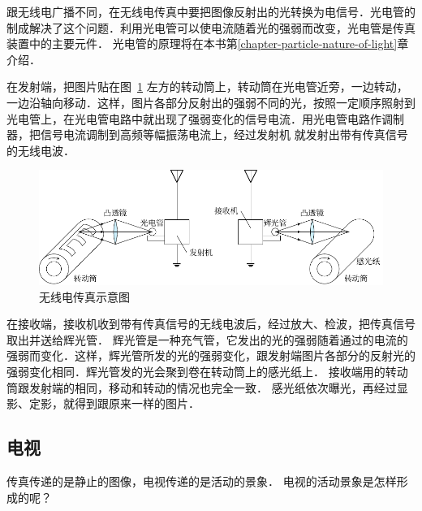 跟无线电广播不同，在无线电传真中要把图像反射出的光转换为电信号．光电管的制成解决了这个问题．利用光电管可以使电流随着光的强弱而改变，光电管是传真装置中的主要元件．
光电管的原理将在本书第\ref{chapter-particle-nature-of-light}章介绍．


在发射端，把图片贴在图~\ref{fig_C_4-21} 左方的转动筒上，转动筒在光电管近旁，一边转动，一边沿轴向移动．这样，图片各部分反射出的强弱不同的光，按照一定顺序照射到光电管上，在光电管电路中就出现了强弱变化的信号电流．用光电管电路作调制器，把信号电流调制到高频等幅振荡电流上，经过发射机
就发射出带有传真信号的无线电波．

\begin{figure}[htbp]
	\centering
	\includegraphics{fig/C/4-21.pdf}
	\caption{无线电传真示意图}\label{fig_C_4-21}
\end{figure}


在接收端，接收机收到带有传真信号的无线电波后，经过放大、检波，把传真信号取出并送给辉光管．
辉光管是一种充气管，它发出的光的强弱随着通过的电流的强弱而变化．这样，辉光管所发的光的强弱变化，跟发射端图片各部分的反射光的强弱变化相同．辉光管发的光会聚到卷在转动筒上的感光纸上．
接收端用的转动筒跟发射端的相同，移动和转动的情况也完全一致．
感光纸依次曝光，再经过显影、定影，就得到跟原来一样的图片．

\subsection{电视}

传真传递的是静止的图像，电视传递的是活动的景象．
电视的活动景象是怎样形成的呢？



